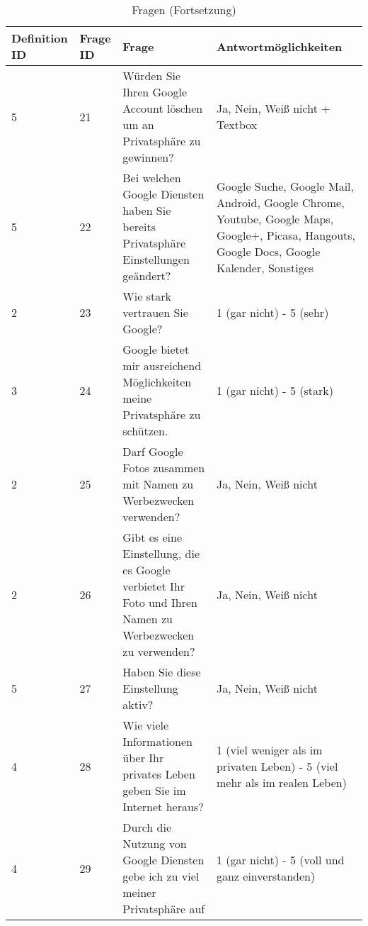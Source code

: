 \begin{table}
	\begin{tabular}[]{ p{1.5cm} | p{1.5cm} | p{5cm} | p{5cm} }
	\hline
	Definition ID & Frage ID & Frage & Antwortmöglichkeiten \\
	\hline \hline
	5 & 21 & Würden Sie Ihren Google Account löschen um an Privatsphäre zu gewinnen? & Ja, Nein, Weiß nicht + Textbox\\
	\hline
	5 & 22 & Bei welchen Google Diensten haben Sie bereits Privatsphäre Einstellungen geändert? & Google Suche, Google Mail, Android, Google Chrome, Youtube, Google Maps, Google+, Picasa, Hangouts, Google Docs, Google Kalender, Sonstiges\\
	\hline
	2 & 23 & Wie stark vertrauen Sie Google? & 1 (gar nicht) - 5 (sehr)\\
	\hline
	3 & 24 & Google bietet mir ausreichend Möglichkeiten meine Privatsphäre zu schützen. & 1 (gar nicht) - 5 (stark)\\
	\hline
	2 & 25 & Darf Google Fotos zusammen mit Namen zu Werbezwecken verwenden? & Ja, Nein, Weiß nicht\\
	\hline
	2 & 26 & Gibt es eine Einstellung, die es Google verbietet Ihr Foto und Ihren Namen zu Werbezwecken zu verwenden? & Ja, Nein, Weiß nicht\\
	\hline
	5 & 27 & Haben Sie diese Einstellung aktiv? & Ja, Nein, Weiß nicht\\
	\hline
	4 & 28 & Wie viele Informationen über Ihr privates Leben geben Sie im Internet heraus? & 1 (viel weniger als im privaten Leben) - 5 (viel mehr als im realen Leben)\\
	\hline
	4 & 29 & Durch die Nutzung von Google Diensten gebe ich zu viel meiner Privatsphäre auf & 1 (gar nicht) - 5 (voll und ganz einverstanden)\\
	\hline
	\end{tabular}
	\caption{Fragen (Fortsetzung)}
\end{table}

